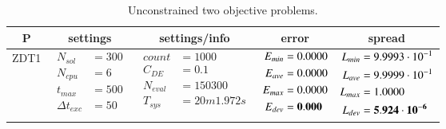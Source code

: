 
\begin{table*} [!t] \centering
\caption{Unconstrained two objective problems.}
\scriptsize  \setlength{\tabcolsep}{0.5em}

\begin{tabular}[c]{ccccc} \toprule
P & settings & settings/info & error & spread \\ \hline

ZDT1
&
{$\!\begin{aligned}
    N_{sol}        &= 300 \\
	N_{cpu}        &= 6 \\
	t_{max}        &= 500 \\
	\Delta t_{exc} &= 50
\end{aligned}$}
&
{$\!\begin{aligned}
	count    &= 1000 \\
	C_{DE}   &= 0.1 \\
	N_{eval} &= 150300 \\
	T_{sys}  &= 20m1.972s
\end{aligned}$}
&
{$\!\begin{aligned}
    E_{min} &= 0.0000 \\
    E_{ave} &= 0.0000 \\
    E_{max} &= 0.0000 \\
    E_{dev} &= {\bf 0.000}
\end{aligned}$}
&
{$\!\begin{aligned}
    L_{min} &= 9.9993\cdot 10^{-1} \\
    L_{ave} &= 9.9999\cdot 10^{-1} \\
    L_{max} &= 1.0000 \\
    L_{dev} &= {\bf 5.924\cdot 10^{-6}}
\end{aligned}$} \\

\hline




\end{tabular}
\end{table*}
